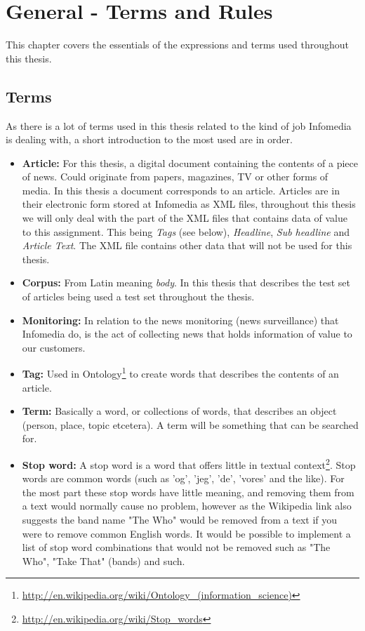 \chapter{General - Terms and Rules}

This chapter covers the essentials of the expressions and terms used throughout this thesis.

\section{Terms}

As there is a lot of terms used in this thesis related to the kind of job Infomedia is dealing with, a short introduction to the most used are in order.
\begin{itemize}
\item \textbf{Article:} For this thesis, a digital document containing the contents of a piece of news. Could originate from papers, magazines, TV or other forms of media. In this thesis a document corresponds to an article. Articles are in their electronic form stored at Infomedia as XML files, throughout this thesis we will only deal with the part of the XML files that contains data of value to this assignment. This being \textit{Tags} (see below), \textit{Headline}, \textit{Sub headline} and \textit{Article Text}. The XML file contains other data that will not be used for this thesis.
\item \textbf{Corpus:} From Latin meaning \textit{body}. In this thesis that describes the test set of articles being used a test set throughout the thesis.
\item \textbf{Monitoring:} In relation to the news monitoring (news surveillance) that Infomedia do, is the act of collecting news that holds information of value to our customers.
\item \textbf{Tag:} Used in Ontology\footnote{\url{http://en.wikipedia.org/wiki/Ontology_(information_science)}} to create words that describes the contents of an article.
\item \textbf{Term:} Basically a word, or collections of words, that describes an object (person, place, topic etcetera). A term will be something that can be searched for.
\item \textbf{Stop word:} A stop word is a word that offers little in textual context\footnote{\url{http://en.wikipedia.org/wiki/Stop_words}}. Stop words are common words (such as 'og', 'jeg', 'de', 'vores' and the like). For the most part these stop words have little meaning, and removing them from a text would normally cause no problem, however as the Wikipedia link also suggests the band name "The Who" would be removed from a text if you were to remove common English words. It would be possible to implement a list of stop word combinations that would not be removed such as "The Who", "Take That" (bands) and such.
\end{itemize}

